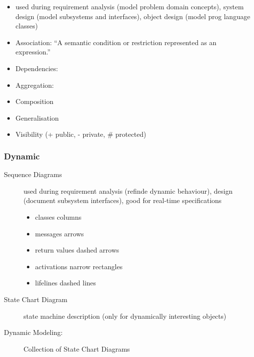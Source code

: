 \documentclass[a4paper, 10pt]{article}
\begin{document}
\begin{description}
\begin{itemize}
		\item used during requirement analysis (model problem domain concepts), system design (model subsystems and interfaces), object design (model prog language classes)
		\item Association: ``A semantic condition or restriction represented as an expression.'' \\
		
		\item Dependencies: \\
		
		\item Aggregation: \\
		
		\item Composition \\
		
		\item Generalisation \\
		
		\item Visibility (+ public, - private, \# protected)
	\end{itemize}
\end{description}

\subsubsection{Dynamic}
\begin{description}
	\item[Sequence Diagrams] used during requirement analysis (refinde dynamic behaviour), design (document subsystem interfaces), good for real-time specifications\\
	
	\begin{itemize}
		\item classes \follows columns
		\item messages \follows arrows
		\item return values  \follows dashed arrows
		\item activations \follows narrow rectangles
		\item lifelines \follows dashed lines
	\end{itemize}
	\item[State Chart Diagram] state machine description (only for dynamically interesting objects)
	\item[Dynamic Modeling:] Collection of State Chart Diagrams
\end{description}
\end{document}
